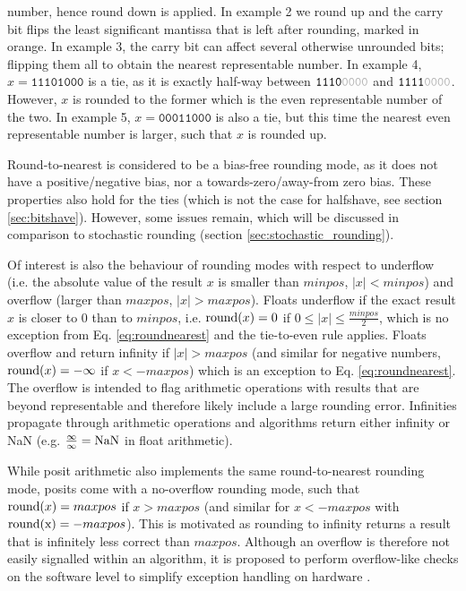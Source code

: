 number, hence round down is applied. In example 2 we round up and the carry bit flips the least significant mantissa that is
left after rounding, marked in orange. In example 3, the carry bit can affect several otherwise unrounded bits; flipping them
all to obtain the nearest representable number. In example 4, $x = \mathtt{11101000}$ is a tie, as it is exactly half-way between
$\mathtt{1110{\color{gray}0000}}$ and $\mathtt{1111{\color{gray}0000}}$. However, $x$ is rounded to the former which is the
even representable number of the two. In example 5,  $x = \mathtt{00011000}$ is also a tie, but this time the nearest even
representable number is larger, such that $x$ is rounded up.

Round-to-nearest is considered to be a bias-free rounding mode, as it does not have a positive/negative bias, nor a 
towards-zero/away-from zero bias. These properties also hold for the ties (which is not the case for halfshave,
see section \ref{sec:bitshave}). However, some issues remain, which will be discussed in comparison to stochastic rounding
(section \ref{sec:stochastic_rounding}).

Of interest is also the behaviour of rounding modes with respect to underflow (i.e. the absolute value of the result $x$
is smaller than $minpos$, $\vert x \vert < minpos$) and overflow (larger than $maxpos$, $\vert x \vert > maxpos$).
Floats underflow if the exact result $x$ is closer to 0 than to $minpos$, i.e. $\operatorname{round}(x) = 0$ if
$0 \leq \vert x \vert \leq \tfrac{minpos}{2}$, which is no exception from Eq. \ref{eq:roundnearest} and the tie-to-even rule
applies. Floats overflow and return infinity if $\vert x \vert > maxpos$ (and similar for negative numbers,
$\operatorname{round}(x) = -\infty$ if $x < -maxpos$) which is an exception to Eq. \ref{eq:roundnearest}. The overflow is
intended to flag arithmetic operations with results that are beyond representable and therefore likely include a large
rounding error. Infinities propagate through arithmetic operations and algorithms return either infinity or NaN
(e.g. $\tfrac{\infty}{\infty} = \operatorname{NaN}$ in float arithmetic).

While posit arithmetic also implements the same round-to-nearest rounding mode, posits come with a no-overflow
rounding mode, such that $\operatorname{round}(x) = maxpos$ if $x > maxpos$ (and similar for $x< -maxpos$ with $\operatorname{round(x)} = -maxpos$).
This is motivated as rounding to infinity returns a result that is infinitely less correct than $maxpos$. Although an overflow
is therefore not easily signalled within an algorithm, it is proposed to perform overflow-like checks on the software level
to simplify exception handling on hardware \citep{Gustafson2017a}.

